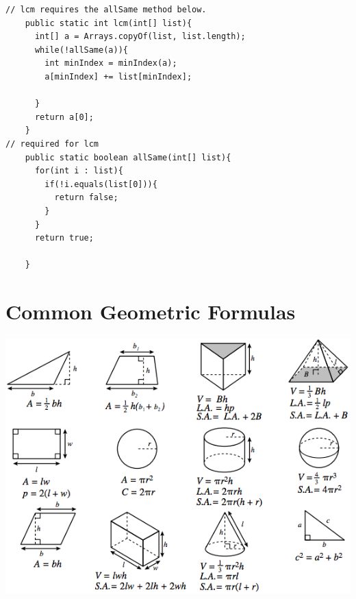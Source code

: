\documentclass{article}
\begin{document}
\begin{verbatim}
// lcm requires the allSame method below.
    public static int lcm(int[] list){
      int[] a = Arrays.copyOf(list, list.length);
      while(!allSame(a)){
        int minIndex = minIndex(a);
        a[minIndex] += list[minIndex];
        
      }
      return a[0];
    }
// required for lcm
    public static boolean allSame(int[] list){
      for(int i : list){
        if(!i.equals(list[0])){
          return false;
        }
      }
      return true;

    }

\end{verbatim}
\section*{Common Geometric Formulas}
\includegraphics[width=5.5in]{geometric.png}\\
\end{document}
